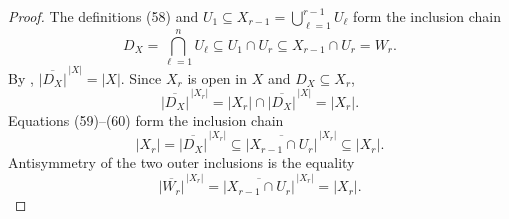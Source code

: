 \begin{proof}
  The definitions (58) and
  $U_1\subseteq X_{r-1}=\bigcup_{\ell=1}^{r-1}U_\ell$ form the inclusion chain
  \[
    D_X=\bigcap_{\ell=1}^nU_\ell
      \subseteq U_1\cap U_r
      \subseteq X_{r-1}\cap U_r=W_r.                             \tag{59}
  \]
  By ,
  $\overline{|D_X|}^{\,|X|}=|X|$.  Since $X_r$ is open in $X$ and
  $D_X\subseteq X_r$,
  \[
    \overline{|D_X|}^{\,|X_r|}
      =|X_r|\cap\overline{|D_X|}^{\,|X|}
      =|X_r|.                                                      \tag{60}
  \]
  Equations (59)--(60) form the inclusion chain
  \[
    |X_r|
      =\overline{|D_X|}^{\,|X_r|}
      \subseteq
        \overline{|X_{r-1}\cap U_r|}^{\,|X_r|}
      \subseteq|X_r|.
  \]
  Antisymmetry of the two outer inclusions is the equality
  \[
    \overline{|W_r|}^{\,|X_r|}
      =\overline{|X_{r-1}\cap U_r|}^{\,|X_r|}
      =|X_r|.
  \]
\end{proof}

